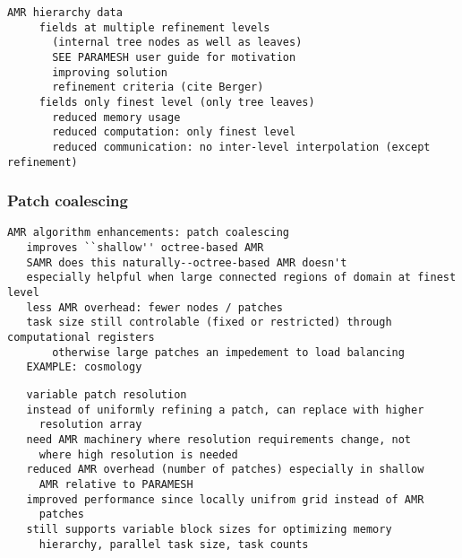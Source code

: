 \documentclass[14pt,letter]{article}
\begin{document}
\begin{verbatim}
AMR hierarchy data
     fields at multiple refinement levels 
       (internal tree nodes as well as leaves)
       SEE PARAMESH user guide for motivation
       improving solution
       refinement criteria (cite Berger)
     fields only finest level (only tree leaves)
       reduced memory usage
       reduced computation: only finest level
       reduced communication: no inter-level interpolation (except refinement)
\end{verbatim}

\subsubsection{Patch coalescing } \label{sss:patch-coalescing}

\begin{verbatim}
AMR algorithm enhancements: patch coalescing
   improves ``shallow'' octree-based AMR
   SAMR does this naturally--octree-based AMR doesn't
   especially helpful when large connected regions of domain at finest level
   less AMR overhead: fewer nodes / patches
   task size still controlable (fixed or restricted) through computational registers
       otherwise large patches an impedement to load balancing
   EXAMPLE: cosmology
\end{verbatim}

\begin{verbatim}
   variable patch resolution
   instead of uniformly refining a patch, can replace with higher
     resolution array
   need AMR machinery where resolution requirements change, not
     where high resolution is needed
   reduced AMR overhead (number of patches) especially in shallow
     AMR relative to PARAMESH
   improved performance since locally unifrom grid instead of AMR
     patches
   still supports variable block sizes for optimizing memory
     hierarchy, parallel task size, task counts
\end{verbatim}

\end{document}
